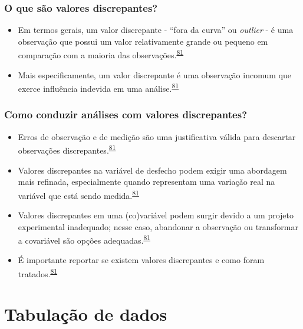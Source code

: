 \documentclass[
  a4paper,
]{book}
\begin{document}
\hypertarget{o-que-suxe3o-valores-discrepantes}{%
\subsection{O que são valores discrepantes?}\label{o-que-suxe3o-valores-discrepantes}}

\begin{itemize}
\item
  Em termos gerais, um valor discrepante - ``fora da curva'' ou \emph{outlier} - é uma observação que possui um valor relativamente grande ou pequeno em comparação com a maioria das observações.\textsuperscript{\protect\hyperlink{ref-zuur2009}{81}}
\item
  Mais especificamente, um valor discrepante é uma observação incomum que exerce influência indevida em uma análise.\textsuperscript{\protect\hyperlink{ref-zuur2009}{81}}
\end{itemize}

\hypertarget{como-conduzir-anuxe1lises-com-valores-discrepantes}{%
\subsection{Como conduzir análises com valores discrepantes?}\label{como-conduzir-anuxe1lises-com-valores-discrepantes}}

\begin{itemize}
\item
  Erros de observação e de medição são uma justificativa válida para descartar observações discrepantes.\textsuperscript{\protect\hyperlink{ref-zuur2009}{81}}
\item
  Valores discrepantes na variável de desfecho podem exigir uma abordagem mais refinada, especialmente quando representam uma variação real na variável que está sendo medida.\textsuperscript{\protect\hyperlink{ref-zuur2009}{81}}
\item
  Valores discrepantes em uma (co)variável podem surgir devido a um projeto experimental inadequado; nesse caso, abandonar a observação ou transformar a covariável são opções adequadas.\textsuperscript{\protect\hyperlink{ref-zuur2009}{81}}
\item
  É importante reportar se existem valores discrepantes e como foram tratados.\textsuperscript{\protect\hyperlink{ref-zuur2009}{81}}
\end{itemize}

\hypertarget{tabulacao-dados}{%
\chapter{\texorpdfstring{\textbf{Tabulação de dados}}{Tabulação de dados}}\label{tabulacao-dados}}
\end{document}
